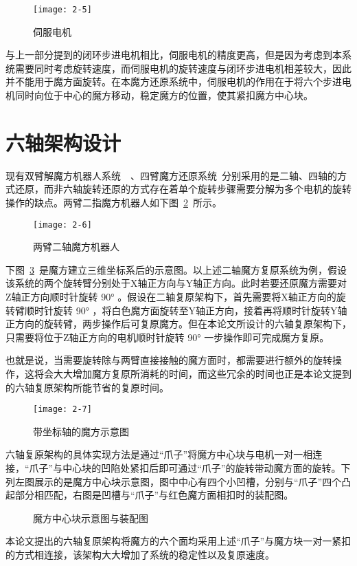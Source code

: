 \begin{figure}[H]
	\centering
	\texttt{[image: 2-5]}
	\caption{伺服电机}\label{fig:2-5}
\end{figure}

与上一部分提到的闭环步进电机相比，伺服电机的精度更高，但是因为考虑到本系统需要同时考虑旋转速度，而伺服电机的旋转速度与闭环步进电机相差较大，因此并不能用于魔方面旋转。在本魔方还原系统中，伺服电机的作用在于将六个步进电机同时向位于中心的魔方移动，稳定魔方的位置，使其紧扣魔方中心块。


\section{六轴架构设计}
现有双臂解魔方机器人系统~\cite{10}~\cite{11}、四臂魔方还原系统~\cite{12}分别采用的是二轴、四轴的方式还原，而非六轴旋转还原的方式存在着单个旋转步骤需要分解为多个电机的旋转操作的缺点。两臂二指魔方机器人如下图~\ref{fig:2-6}~所示。

\begin{figure}[H]
	\centering
	\texttt{[image: 2-6]}
	\caption{两臂二轴魔方机器人}\label{fig:2-6}
\end{figure}

下图~\ref{fig:2-7}~是魔方建立三维坐标系后的示意图。以上述二轴魔方复原系统为例，假设该系统的两个旋转臂分别处于X轴正方向与Y轴正方向。此时若要还原魔方需要对Z轴正方向顺时针旋转 90° 。假设在二轴复原架构下，首先需要将X轴正方向的旋转臂顺时针旋转 90° ，将白色魔方面旋转至Y轴正方向，接着再将顺时针旋转Y轴正方向的旋转臂，两步操作后可复原魔方。但在本论文所设计的六轴复原架构下，只需要将位于Z轴正方向的电机顺时针旋转 90° 一步操作即可完成魔方复原。

也就是说，当需要旋转除与两臂直接接触的魔方面时，都需要进行额外的旋转操作，这将会大大增加魔方复原所消耗的时间，而这些冗余的时间也正是本论文提到的六轴复原架构所能节省的复原时间。

\begin{figure}[H]
	\centering
	\texttt{[image: 2-7]}
	\caption{带坐标轴的魔方示意图}\label{fig:2-7}
\end{figure}

六轴复原架构的具体实现方法是通过“爪子”将魔方中心块与电机一对一相连接，“爪子”与中心块的凹陷处紧扣后即可通过“爪子”的旋转带动魔方面的旋转。下列左图展示的是魔方中心块示意图，图中中心有四个小凹槽，分别与“爪子”四个凸起部分相匹配，右图是凹槽与“爪子”与红色魔方面相扣时的装配图。

\begin{figure}[H]
	\centering
	\subfigure{\texttt{[image: 2-8]}}
	\subfigure{\texttt{[image: 2-8.1]}}
	\caption{魔方中心块示意图与装配图}\label{fig:2-8}
\end{figure}
本论文提出的六轴复原架构将魔方的六个面均采用上述“爪子”与魔方块一对一紧扣的方式相连接，该架构大大增加了系统的稳定性以及复原速度。

